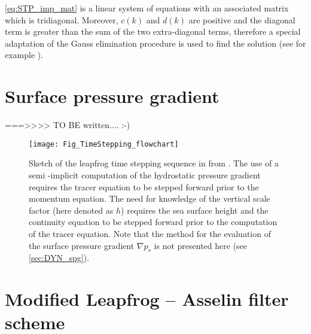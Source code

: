 \documentclass[../main/NEMO_manual]{subfiles}
\begin{document}
\autoref{eq:STP_imp_mat} is a linear system of equations with an associated matrix which is tridiagonal.
Moreover,
$c(k)$ and $d(k)$ are positive and the diagonal term is greater than the sum of the two extra-diagonal terms,
therefore a special adaptation of the Gauss elimination procedure is used to find the solution
(see for example \citet{Richtmyer1967}).

\section{Surface pressure gradient}
\label{sec:STP_spg_ts}

===>>>>  TO BE written....  :-)

\begin{figure}[!t]
  \begin{center}
    \texttt{[image: Fig\_TimeStepping\_flowchart]}
    \caption{
      \protect\label{fig:TimeStep_flowchart}
      Sketch of the leapfrog time stepping sequence in \NEMO from \citet{Leclair_Madec_OM09}.
      The use of a semi -implicit computation of the hydrostatic pressure gradient requires the tracer equation to
      be stepped forward prior to the momentum equation.
      The need for knowledge of the vertical scale factor (here denoted as $h$) requires the sea surface height and
      the continuity equation to be stepped forward prior to the computation of the tracer equation.
      Note that the method for the evaluation of the surface pressure gradient $\nabla p_s$ is not presented here
      (see \autoref{sec:DYN_spg}).
    }
  \end{center}
\end{figure}

\section{Modified Leapfrog -- Asselin filter scheme}
\label{sec:STP_mLF}
\end{document}
